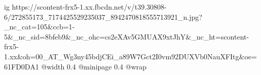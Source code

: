  
 
 
 
 

\ifcmt
  ig https://scontent-frx5-1.xx.fbcdn.net/v/t39.30808-6/272855173_7174425529235037_8942470818555713921_n.jpg?_nc_cat=105&ccb=1-5&_nc_sid=8bfeb9&_nc_ohc=cs2eXAv5GMUAX9xtJhY&_nc_ht=scontent-frx5-1.xx&oh=00_AT_Wg3ny45bdjCEi_a89W7Gct2I0vm92DUXVb0NauXFItg&oe=61FD0DA1
  @width 0.4
  @minipage 0.4
  @wrap \parpic[r]
\fi
